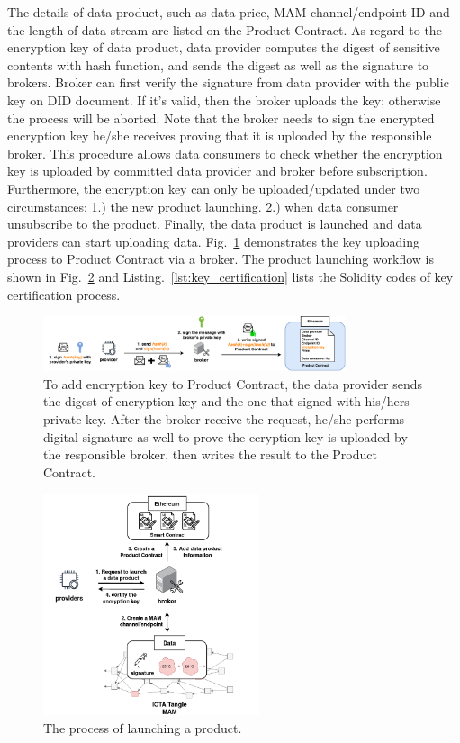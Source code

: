 \documentclass[conference]{IEEEtran}
\begin{document}
The details of data product, such as data price, MAM channel/endpoint ID and the length of data stream are listed on the Product Contract. As regard to the encryption key of data product, data provider computes the digest of sensitive contents with hash function, and sends the digest as well as the signature to brokers. Broker can first verify the signature from data provider with the public key on DID document. If it's valid, then the broker uploads the key; otherwise the process will be aborted. Note that the broker needs to sign the encrypted encryption key he/she receives proving that it is uploaded by the responsible broker. This procedure allows data consumers to check whether the encryption key is uploaded by committed data provider and broker before subscription. Furthermore, the encryption key can only be uploaded/updated under two circumstances: 1.) the new product launching. 2.) when data consumer unsubscribe to the product. Finally, the data product is launched and data providers can start uploading data. Fig.~\ref{fig:key_upload} demonstrates the key uploading process to Product Contract via a broker. The product launching workflow is shown in Fig.~\ref{fig:launching_product} and Listing.~\ref{lst:key_certification} lists the Solidity codes of key certification process.

\begin{figure}[h]
    \centering
    \includegraphics[width=3.5in]{key_upload}
    \caption{To add encryption key to Product Contract, the data provider sends the digest of encryption key and the one that signed with his/hers private key. After the broker receive the request, he/she performs digital signature as well to prove the ecryption key is uploaded by the responsible broker, then writes the result to the Product Contract.}
    \label{fig:key_upload}
\end{figure}

\begin{figure}[!t]
    \centering
    \includegraphics[width=2.5in]{launching_product}
    \caption{The process of launching a product.}
    \label{fig:launching_product}
\end{figure}
\end{document}
